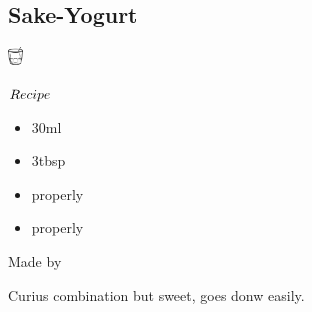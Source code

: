 \subsection{Sake-Yogurt}
\vspace{-7mm}
\hspace{40mm}
\includegraphics[width=4mm]{cocktail_glass_rock.png}
\vspace{2.5mm}
\begin{itembox}[l]{\boldmath $Recipe$}
\begin{itemize}
\setlength{\parskip}{0cm}
\setlength{\itemsep}{0cm}
\item \sake 30ml
\item \yogurt 3tbsp
\item \honey properly
\item \milk properly
\end{itemize}
\vspace{-4mm}
Made by \build
\end{itembox}
Curius combination but sweet, goes donw easily.
